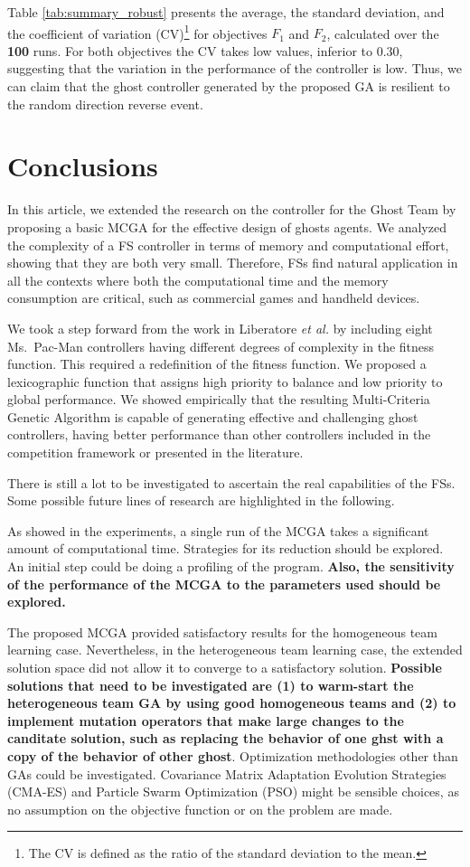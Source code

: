 \documentclass[journal]{IEEEtran}
\begin{document}
Table \ref{tab:summary_robust} presents the average, the standard deviation, and the coefficient of variation (CV)\footnote{The CV is defined as the ratio of the standard deviation to the mean.} for objectives $F_1$ and $F_2$, calculated over the \textbf{100} runs. For both objectives the CV takes low values, inferior to 0.30, suggesting that the variation in the performance of the controller is low. Thus, we can claim that the ghost controller generated by the proposed GA is resilient to the random direction reverse event.

\section{Conclusions}
\label{sec:Conclusions}
In this article, we extended the research on the controller for the Ghost Team by proposing a basic MCGA for the effective design of ghosts agents. We analyzed the complexity of a FS controller in terms of memory and computational effort, showing that they are both very small. Therefore, FSs find natural application in all the contexts where both the computational time and the memory consumption are critical, such as commercial games and handheld devices.

We took a step forward from the work in Liberatore \emph{et al.} \cite{Liberatore2014} by including eight Ms.\  Pac-Man controllers having different degrees of complexity in the fitness function. This required a redefinition of the fitness function. We proposed a lexicographic function that assigns high priority to balance and low priority to global performance. We showed empirically that the resulting Multi-Criteria Genetic Algorithm is capable of generating effective and challenging ghost controllers, having better performance than other controllers included in the competition framework or presented in the literature.

There is still a lot to be investigated to ascertain the real capabilities of the FSs. Some possible future lines of research are highlighted in the following.

As showed in the experiments, a single run of the MCGA takes a significant amount of computational time. Strategies for its reduction should be explored. An initial step could be doing a profiling of the program. \textbf{Also, the sensitivity of the performance of the MCGA to the parameters used should be explored.}

The proposed MCGA provided satisfactory results for the homogeneous team learning case. Nevertheless, in the heterogeneous team learning case, the extended solution space did not allow it to converge to a satisfactory solution.\textbf{ Possible solutions that need to be investigated are (1) to warm-start the heterogeneous team GA by using good homogeneous teams and (2) to implement mutation operators that make large changes to the canditate solution, such as replacing the behavior of one ghst with a copy of the behavior of other ghost}.  Optimization methodologies other than GAs could be investigated. Covariance Matrix Adaptation Evolution Strategies (CMA-ES) and Particle Swarm Optimization (PSO) might be sensible choices, as no assumption on the objective function or on the problem are made.
\end{document}
